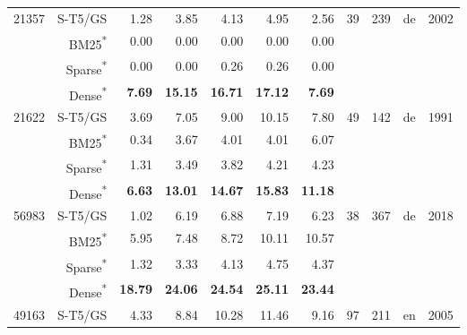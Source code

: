 \documentclass[11pt]{article}
\begin{document}
\begin{table*}[]
\begin{tabular}{l|r|r|r|r|r|r|c|c|c|c}
    \hline
    \multirow{4}{3em}{21357} &    S-T5/GS &   1.28 &   3.85 &    4.13 &    4.95 &         2.56 &       \multirow{4}{2em}{39} &    \multirow{4}{1em}{239} &        \multirow{4}{1em}{de} &            \multirow{4}{2em}{2002} \\
     &    BM25\textsuperscript{*} &   0.00 &   0.00 &    0.00 &    0.00 &         0.00 &        &     &         &           \\
     &    Sparse\textsuperscript{*} &   0.00 &   0.00 &    0.26 &    0.26 &         0.00 &        &     &         &           \\
     &    Dense\textsuperscript{*} &   \textbf{7.69} &  \textbf{15.15} &   \textbf{16.71} &   \textbf{17.12} &         \textbf{7.69} &        &     &         &           \\
    \hline
    \multirow{4}{3em}{21622} &    S-T5/GS &   3.69 &   7.05 &    9.00 &   10.15 &         7.80 &       \multirow{4}{2em}{49} &    \multirow{4}{1em}{142} &        \multirow{4}{1em}{de} &            \multirow{4}{2em}{1991} \\
     &    BM25\textsuperscript{*} &   0.34 &   3.67 &    4.01 &    4.01 &         6.07 &        &     &         &           \\
     &    Sparse\textsuperscript{*} &   1.31 &   3.49 &    3.82 &    4.21 &         4.23 &        &     &         &           \\
     &    Dense\textsuperscript{*} &   \textbf{6.63} &  \textbf{13.01} &   \textbf{14.67} &   \textbf{15.83} &        \textbf{11.18} &        &     &         &           \\
    \hline
    \multirow{4}{3em}{56983} &    S-T5/GS &   1.02 &   6.19 &    6.88 &    7.19 &         6.23 &       \multirow{4}{2em}{38} &    \multirow{4}{1em}{367} &        \multirow{4}{1em}{de} &            \multirow{4}{2em}{2018} \\
     &    BM25\textsuperscript{*} &   5.95 &   7.48 &    8.72 &   10.11 &        10.57 &        &     &         &           \\
     &    Sparse\textsuperscript{*} &   1.32 &   3.33 &    4.13 &    4.75 &         4.37 &        &     &         &           \\
     &    Dense\textsuperscript{*} &  \textbf{18.79} &  \textbf{24.06} &   \textbf{24.54} &   \textbf{25.11} &        \textbf{23.44} &        &     &         &           \\
    \hline
    \multirow{4}{3em}{49163} &    S-T5/GS &   4.33 &   8.84 &   10.28 &   11.46 &         9.16 &       \multirow{4}{2em}{97} &    \multirow{4}{1em}{211} &        \multirow{4}{1em}{en} &            \multirow{4}{2em}{2005} \\

\end{tabular}
\end{table*}
\end{document}
